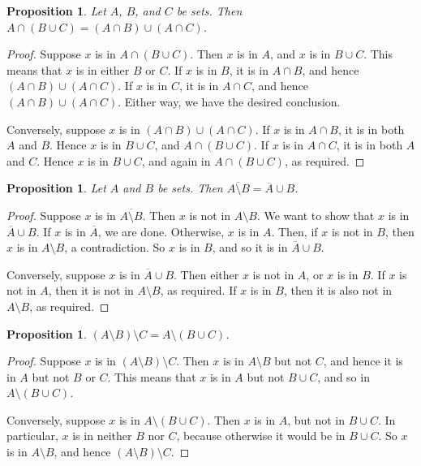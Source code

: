 \documentclass{article}
\newtheorem{proposition}[theorem]{Proposition}
\begin{document}
\begin{proposition} 
Let $A$, $B$, and $C$ be sets. Then $A \cap (B \cup C) = (A \cap B) \cup (A 
\cap C)$.
\end{proposition}

\begin{proof}
Suppose $x$ is in $A \cap (B \cup C)$. Then $x$ is in $A$, and $x$ is in $B 
\cup C$. This means that $x$ is in either $B$ or $C$. If $x$ is in $B$, it is 
in 
$A \cap B$, and hence $(A \cap B) \cup (A \cap C)$. If $x$ is in $C$, it is in 
$A \cap C$, and hence $(A \cap B) \cup (A \cap C)$. Either way, we have the 
desired conclusion.

Conversely, suppose $x$ is in $(A \cap B) \cup (A \cap C)$. If $x$ is in $A 
\cap B$, it is in both $A$ and $B$. Hence $x$ is in $B \cup C$, and $A \cap (B 
\cup C)$. If $x$ is in $A \cap C$, it is in both $A$ and $C$. Hence $x$ is in 
$B 
\cup C$, and again in $A \cap (B \cup C)$, as required.
\end{proof}

\begin{proposition}
Let $A$ and $B$ be sets. Then $\overline{A \setminus B} = \overline{A} \cup B$.
\end{proposition}

\begin{proof}
Suppose $x$ is in $\overline{A \setminus B}$. Then $x$ is not in $A \setminus 
B$. We want to show that $x$ is in $\overline{A} \cup B$. If $x$ is in 
$\overline{A}$, we are done. Otherwise, $x$ is in $A$. Then, if $x$ is not in 
$B$, then $x$ is in $A \setminus B$, a contradiction. So $x$ is in $B$, and so 
it is in $\overline{A} \cup B$.

Conversely, suppose $x$ is in $\overline{A} \cup B$. Then either $x$ is not in 
$A$, or $x$ is in $B$. If $x$ is not in $A$, then it is not in $A \setminus B$, 
as required. If $x$ is in $B$, then it is also not in $A \setminus B$, as 
required.
\end{proof}

\begin{proposition}
$(A \setminus B) \setminus C = A \setminus (B \cup C)$.
 \end{proposition}

\begin{proof}
Suppose $x$ is in $(A \setminus B) \setminus C$. Then $x$ is
in $A \setminus B$ but not $C$, and hence it is in $A$ but not $B$ or
$C$. This means that $x$ is in $A$ but not $B \cup C$, and so in $A
\setminus (B \cup C)$.

Conversely, suppose $x$ is in $A \setminus (B \cup C)$. Then $x$ is in
$A$, but not in $B \cup C$. In particular, $x$ is in neither $B$ nor
$C$, because otherwise it would be in $B \cup C$. So $x$ is in $A
\setminus B$, and hence $(A \setminus B) \setminus C$.
\end{proof}
\end{document}

